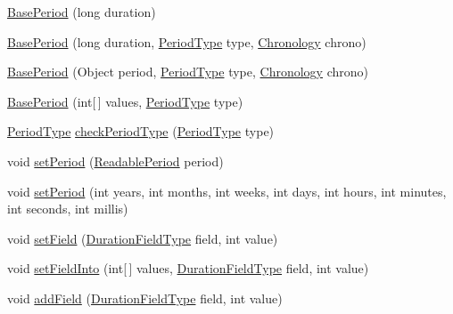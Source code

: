 \begin{DoxyCompactItemize}
\hyperlink{classorg_1_1joda_1_1time_1_1base_1_1_base_period_aaee7fc56f9ab380abe69626298ddb93a}{Base\-Period} (long duration)
\item 
\hyperlink{classorg_1_1joda_1_1time_1_1base_1_1_base_period_a3a4e96240141df7c9073788a2f5d065b}{Base\-Period} (long duration, \hyperlink{classorg_1_1joda_1_1time_1_1_period_type}{Period\-Type} type, \hyperlink{classorg_1_1joda_1_1time_1_1_chronology}{Chronology} chrono)
\item 
\hyperlink{classorg_1_1joda_1_1time_1_1base_1_1_base_period_af81f58427d609378e78542e89ead2817}{Base\-Period} (Object period, \hyperlink{classorg_1_1joda_1_1time_1_1_period_type}{Period\-Type} type, \hyperlink{classorg_1_1joda_1_1time_1_1_chronology}{Chronology} chrono)
\item 
\hyperlink{classorg_1_1joda_1_1time_1_1base_1_1_base_period_a7cba38b322744e283ace22d6d9303430}{Base\-Period} (int\mbox{[}$\,$\mbox{]} values, \hyperlink{classorg_1_1joda_1_1time_1_1_period_type}{Period\-Type} type)
\item 
\hyperlink{classorg_1_1joda_1_1time_1_1_period_type}{Period\-Type} \hyperlink{classorg_1_1joda_1_1time_1_1base_1_1_base_period_af41b0410d6fe06791f50e0c49ae2d393}{check\-Period\-Type} (\hyperlink{classorg_1_1joda_1_1time_1_1_period_type}{Period\-Type} type)
\item 
void \hyperlink{classorg_1_1joda_1_1time_1_1base_1_1_base_period_a658ea914e51b995da3ad4d2ae282e40f}{set\-Period} (\hyperlink{interfaceorg_1_1joda_1_1time_1_1_readable_period}{Readable\-Period} period)
\item 
void \hyperlink{classorg_1_1joda_1_1time_1_1base_1_1_base_period_a79fda24532a418f2145346961aa17ce0}{set\-Period} (int years, int months, int weeks, int days, int hours, int minutes, int seconds, int millis)
\item 
void \hyperlink{classorg_1_1joda_1_1time_1_1base_1_1_base_period_ad3cb9f92e74dd52c3df407ac2f0e8448}{set\-Field} (\hyperlink{classorg_1_1joda_1_1time_1_1_duration_field_type}{Duration\-Field\-Type} field, int value)
\item 
void \hyperlink{classorg_1_1joda_1_1time_1_1base_1_1_base_period_af0cbd3f1cf61528339ac3cbf193e612d}{set\-Field\-Into} (int\mbox{[}$\,$\mbox{]} values, \hyperlink{classorg_1_1joda_1_1time_1_1_duration_field_type}{Duration\-Field\-Type} field, int value)
\item 
void \hyperlink{classorg_1_1joda_1_1time_1_1base_1_1_base_period_adf0e9bec9bbf28599f0eac9968f91328}{add\-Field} (\hyperlink{classorg_1_1joda_1_1time_1_1_duration_field_type}{Duration\-Field\-Type} field, int value)

\end{DoxyCompactItemize}
